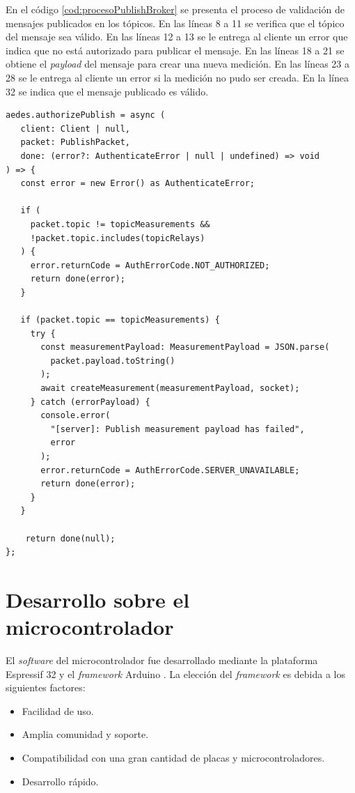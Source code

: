 En el código \ref{cod:procesoPublishBroker} se presenta el proceso de validación de mensajes publicados en los tópicos. En las líneas 8 a 11 se verifica que el tópico del mensaje sea válido. En las líneas 12 a 13 se le entrega al cliente un error que indica que no está autorizado para publicar el mensaje. En las líneas 18 a 21 se obtiene el \emph{payload} del mensaje para crear una nueva medición. En las líneas 23 a 28 se le entrega al cliente un error si la medición no pudo ser creada. En la línea 32 se indica que el mensaje publicado es válido.

\begin{lstlisting}[label=cod:procesoPublishBroker,caption=Validación de mensajes.]
aedes.authorizePublish = async (
   client: Client | null,
   packet: PublishPacket,
   done: (error?: AuthenticateError | null | undefined) => void
) => {
   const error = new Error() as AuthenticateError;

   if (
     packet.topic != topicMeasurements &&
     !packet.topic.includes(topicRelays)
   ) {
     error.returnCode = AuthErrorCode.NOT_AUTHORIZED;
     return done(error);
   }

   if (packet.topic == topicMeasurements) {
     try {
       const measurementPayload: MeasurementPayload = JSON.parse(
         packet.payload.toString()
       );
       await createMeasurement(measurementPayload, socket);
     } catch (errorPayload) {
       console.error(
         "[server]: Publish measurement payload has failed",
         error
       );
       error.returnCode = AuthErrorCode.SERVER_UNAVAILABLE;
       return done(error);
     }
   }

    return done(null);
};
\end{lstlisting}

\section{Desarrollo sobre el microcontrolador}

El \emph{software} del microcontrolador fue desarrollado mediante la plataforma Espressif 32 \citep{WEBSITE:ESPRESSIF32} y el \emph{framework} Arduino \citep{WEBSITE:ARDUINO}. La elección del \emph{framework} es debida a los siguientes factores: 

\begin{itemize}
	\item Facilidad de uso.
	\item Amplia comunidad y soporte.
	\item Compatibilidad con una gran cantidad de placas y microcontroladores.
	\item Desarrollo rápido.
\end{itemize}

